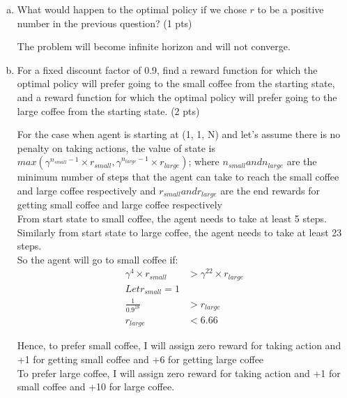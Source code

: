 \documentclass[12pt]{article}
\begin{document}
\begin{enumerate}[a)]
\item What would happen to the optimal policy if we chose $r$ to be a positive number in the previous question? (1 pts)

\begin{solution}
The problem will become infinite horizon and will not converge.
\end{solution}

\item For a fixed discount factor of 0.9, find a reward function for which the optimal policy will prefer going to the small coffee from the starting state, and a reward function for which the optimal policy will prefer going to the large coffee from the starting state. (2 pts)

\begin{solution}
For the case  when agent is starting at (1, 1, N) and let's assume there is no penalty on taking actions, the value of state is $max(\gamma^{n_{small} -1} \times r_{small}, \gamma^{n_{large} -1} \times r_{large})$; where $n_{small} and n_{large}$ are the minimum number of steps that the agent can take to reach the small coffee and large coffee respectively and $r_{small} and r_{large}$ are the end rewards for getting small coffee and large coffee respectively\\
From start state to small coffee, the agent needs to take at least 5 steps. Similarly from start state to large coffee, the agent needs to take at least 23 steps.\\
So the agent will go to small coffee if:
\begin{align} 
\gamma^4 \times r_{small} &> \gamma^{22} \times r_{large} \\
Let r_{small} = 1 \\
\frac{1}{0.9^{18}} &> r_{large}\\
r_{large} &< 6.66
\end{align}

Hence, to prefer small coffee, I will assign zero reward for taking action and +1 for getting small coffee and +6 for getting large coffee\\

To prefer large coffee, I will assign zero reward for taking action and +1 for small coffee and +10 for large coffee.
\end{solution}

\end{enumerate}
\end{document}
